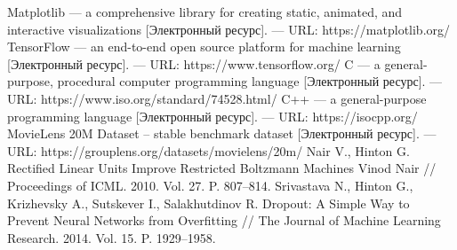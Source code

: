 \documentclass[a4paper,article,14pt]{extarticle}
\begin{document}
\begin{thebibliography}{1}
 Matplotlib --- a comprehensive library for creating static, animated, and interactive visualizations [Электронный ресурс]. — URL: https://matplotlib.org/
 TensorFlow --- an end-to-end open source platform for machine learning [Электронный ресурс]. — URL: https://www.tensorflow.org/
 C --- a general-purpose, procedural computer programming language [Электронный ресурс]. — URL: https://www.iso.org/standard/74528.html/
 C++ --- a general-purpose programming language [Электронный ресурс]. — URL: https://isocpp.org/
 MovieLens 20M Dataset -- stable benchmark dataset [Электронный ресурс]. — URL: https://grouplens.org/datasets/movielens/20m/
 Nair V., Hinton G. Rectified Linear Units Improve Restricted Boltzmann Machines Vinod Nair // Proceedings of ICML. 2010. Vol. 27. P. 807--814.
 Srivastava N., Hinton G., Krizhevsky A., Sutskever I., Salakhutdinov R. Dropout: A Simple Way to Prevent Neural Networks from Overfitting // The Journal of Machine Learning Research. 2014. Vol. 15. P. 1929--1958.
\end{thebibliography}
\end{document}
